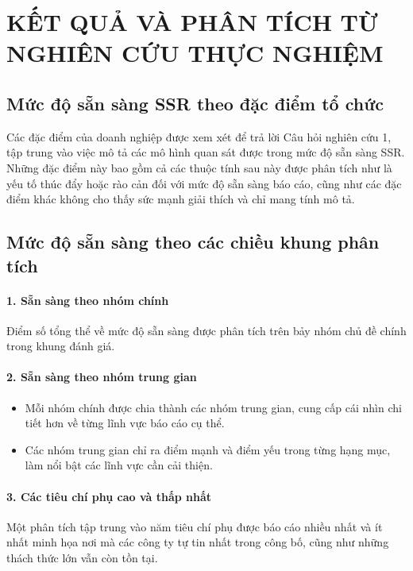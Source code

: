 \chapter{KẾT QUẢ VÀ PHÂN TÍCH TỪ NGHIÊN CỨU THỰC NGHIỆM}

\section{Mức độ sẵn sàng SSR theo đặc điểm tổ chức}
Các đặc điểm của doanh nghiệp được xem xét để trả lời Câu hỏi nghiên cứu 1, tập trung vào việc mô tả các mô hình quan sát được trong mức độ sẵn sàng SSR.
Những đặc điểm này bao gồm cả các thuộc tính sau này được phân tích như là yếu tố thúc đẩy hoặc rào cản đối với mức độ sẵn sàng báo cáo, cũng như các đặc điểm khác không cho thấy sức mạnh giải thích và chỉ mang tính mô tả.

\section{Mức độ sẵn sàng theo các chiều khung phân tích}

\subsubsection{1. Sẵn sàng theo nhóm chính}
Điểm số tổng thể về mức độ sẵn sàng được phân tích trên bảy nhóm chủ đề chính trong khung đánh giá.

\subsubsection{2. Sẵn sàng theo nhóm trung gian}
\begin{itemize}
\item Mỗi nhóm chính được chia thành các nhóm trung gian, cung cấp cái nhìn chi tiết hơn về từng lĩnh vực báo cáo cụ thể.
\item Các nhóm trung gian chỉ ra điểm mạnh và điểm yếu trong từng hạng mục, làm nổi bật các lĩnh vực cần cải thiện.
\end{itemize}

\subsubsection{3. Các tiêu chí phụ cao và thấp nhất}
Một phân tích tập trung vào năm tiêu chí phụ được báo cáo nhiều nhất và ít nhất minh họa nơi mà các công ty tự tin nhất trong công bố, cũng như những thách thức lớn vẫn còn tồn tại.

